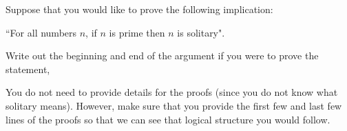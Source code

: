 \begin{questions}


\question Suppose that you would like to prove the following implication: 
\begin{center}
``For all numbers $n$, if $n$ is prime then $n$ is solitary". 
\end{center}
Write out the beginning and end of the argument if you were to prove the statement, 
You do not need to provide details for the proofs (since you do not know what solitary means). However, make sure that you provide the first few and last few lines of the proofs so that we can see that logical structure you would follow.




\end{questions}
